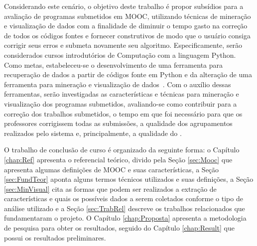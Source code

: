 	Considerando este cenário, o objetivo deste trabalho é propor subsídios para a
	avaliação de programas submetidos em MOOC, utilizando técnicas de mineração e visualização
	de dados com a finalidade de diminuir o tempo gasto na correção de todos os códigos
	fontes e  fornecer  construtivos de modo que o usuário consiga
	corrigir seus erros e submeta novamente seu algoritmo. Especificamente, serão
	considerados cursos introdutórios de Computação com a linguagem Python. Como
	metas, estabeleceu-se o desenvolvimento de uma ferramenta para recuperação de
	dados a partir de códigos fonte em Python e da alteração de uma ferramenta para
	mineração e visualização de dados~\cite{Alencar}. Com o auxílio dessas ferramentas,
	serão investigadas as características e técnicas para mineração e visualização
	dos programas submetidos, avaliando-se como contribuir para	a correção dos trabalhos
	submetidos, o tempo em que foi necessário para que os professores corrigissem todas
	as submissões, a qualidade dos agrupamentos realizados pelo sistema e, principalmente,
	a qualidade do .
	
	O trabalho de conclusão de curso é organizado da seguinte forma: o Capítulo
	\ref{chap:Ref} apresenta o referencial teórico, divido pela Seção \ref{sec:Mooc}
	que apresenta algumas definições de MOOC e suas características, a Seção \ref{sec:FundTeor}
	aponta alguns termos técnicos utilizados e suas definições, a Seção \ref{sec:MinVisual}
	cita as formas que podem ser realizados a extração de características e quais os
	possíveis dados a serem coletados conforme o tipo de análise utilizado e a Seção
	\ref{sec:TrabRel} descreve os trabalhos relacionados que fundamentaram o projeto.
	O Capítulo \ref{chap:Proposta} apresenta a metodologia de pesquisa para obter os
	resultados, seguido do Capítulo \ref{chap:Result} que possui os resultados
	preliminares.